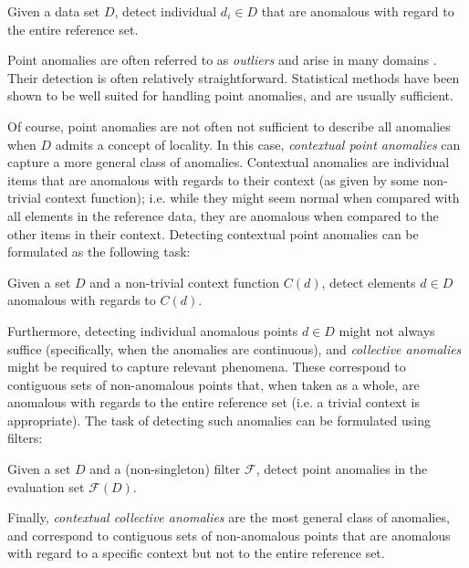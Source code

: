 \begin{task}
  \label{task:point}
  Given a data set $D$, detect individual $d_i \in D$ that are anomalous with regard to the entire reference set.
\end{task}

Point anomalies are often referred to as \emph{outliers} and arise in many domains \cite{eskin}. Their detection is often relatively straightforward. Statistical methods have been shown to be well suited for handling point anomalies, and are usually sufficient.

Of course, point anomalies are not often not sufficient to describe all anomalies when $D$ admits a concept of locality. In this case, \emph{contextual point anomalies} can capture a more general class of anomalies. Contextual anomalies are individual items that are anomalous with regards to their context (as given by some non-trivial context function); i.e. while they might seem normal when compared with all elements in the reference data, they are anomalous when compared to the other items in their context. Detecting contextual point anomalies can be formulated as the following task:

\begin{task}
  \label{task:contextual}
  Given a set $D$ and a non-trivial context function $C(d)$, detect elements $d \in D$ anomalous with regards to $C(d)$.
\end{task}

Furthermore, detecting individual anomalous points $d \in D$ might not always suffice (specifically, when the anomalies are continuous), and \emph{collective anomalies} might be required to capture relevant phenomena. These correspond to contiguous sets of non-anomalous points that, when taken as a whole, are anomalous with regards to the entire reference set (i.e. a trivial context is appropriate). The task of detecting such anomalies can be formulated using filters:

\begin{task}
  \label{task:collective}
  Given a set $D$ and a (non-singleton) filter $\mathcal{F}$, detect point anomalies in the evaluation set $\mathcal{F}(D)$.
\end{task}

Finally, \emph{contextual collective anomalies} are the most general class of anomalies, and correspond to contiguous sets of non-anomalous points that are anomalous with regard to a specific context but not to the entire reference set.  

